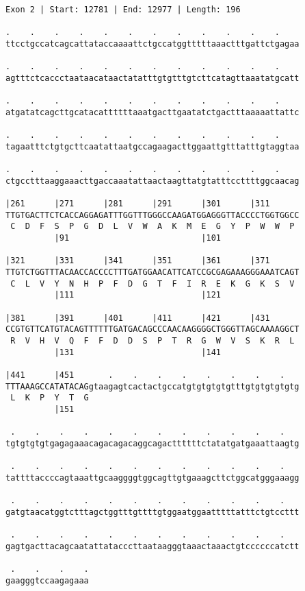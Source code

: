 \documentclass{article}
\begin{document}
\begin{Verbatim}
Exon 2 | Start: 12781 | End: 12977 | Length: 196
 
.    .    .    .    .    .    .    .    .    .    .    .    
ttcctgccatcagcattataccaaaattctgccatggtttttaaactttgattctgagaa
  
.    .    .    .    .    .    .    .    .    .    .    .    
agtttctcaccctaataacataactatatttgtgtttgtcttcatagttaaatatgcatt
  
.    .    .    .    .    .    .    .    .    .    .    .    
atgatatcagcttgcatacattttttaaatgacttgaatatctgactttaaaaattattc
  
.    .    .    .    .    .    .    .    .    .    .    .    
tagaatttctgtgcttcaatattaatgccagaagacttggaattgtttatttgtaggtaa
  
.    .    .    .    .    .    .    .    .    .    .    .    
ctgcctttaaggaaacttgaccaaatattaactaagttatgtatttccttttggcaacag
  
|261      |271      |281      |291      |301      |311      
TTGTGACTTCTCACCAGGAGATTTGGTTTGGGCCAAGATGGAGGGTTACCCCTGGTGGCC
 C  D  F  S  P  G  D  L  V  W  A  K  M  E  G  Y  P  W  W  P 
          |91                           |101                
  
|321      |331      |341      |351      |361      |371      
TTGTCTGGTTTACAACCACCCCTTTGATGGAACATTCATCCGCGAGAAAGGGAAATCAGT
 C  L  V  Y  N  H  P  F  D  G  T  F  I  R  E  K  G  K  S  V 
          |111                          |121                
  
|381      |391      |401      |411      |421      |431      
CCGTGTTCATGTACAGTTTTTTGATGACAGCCCAACAAGGGGCTGGGTTAGCAAAAGGCT
 R  V  H  V  Q  F  F  D  D  S  P  T  R  G  W  V  S  K  R  L 
          |131                          |141                
  
|441      |451       .    .    .    .    .    .    .    .   
TTTAAAGCCATATACAGgtaagagtcactactgccatgtgtgtgtgtttgtgtgtgtgtg
 L  K  P  Y  T  G                                           
          |151                                              
  
 .    .    .    .    .    .    .    .    .    .    .    .   
tgtgtgtgtgagagaaacagacagacaggcagacttttttctatatgatgaaattaagtg
  
 .    .    .    .    .    .    .    .    .    .    .    .   
tattttaccccagtaaattgcaaggggtggcagttgtgaaagcttctggcatgggaaagg
  
 .    .    .    .    .    .    .    .    .    .    .    .   
gatgtaacatggtctttagctggtttgttttgtggaatggaatttttatttctgtccttt
  
 .    .    .    .    .    .    .    .    .    .    .    .   
gagtgacttacagcaatattatacccttaataagggtaaactaaactgtccccccatctt
  
 .    .    .    .
gaagggtccaagagaaa
\end{Verbatim}
\end{document}
